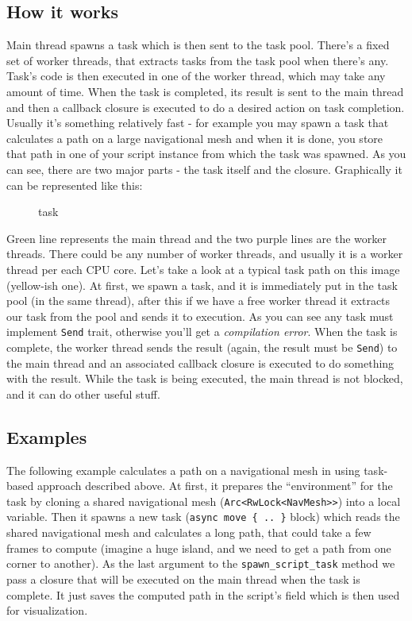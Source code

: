 \documentclass[
]{book}
\theoremstyle{definition}
\theoremstyle{definition}
\theoremstyle{definition}
\theoremstyle{definition}
\theoremstyle{remark}
\begin{document}
\subsection{How it works}\label{how-it-works}

Main thread spawns a task which is then sent to the task pool. There's a fixed set of worker threads, that extracts tasks from the task pool when there's any. Task's code is then executed in one of the worker thread, which may take any amount of time. When the task is completed, its result is sent to the main thread and then a callback closure is executed to do a desired action on task completion. Usually it's something relatively fast - for example you may spawn a task that calculates a path on a large navigational mesh and when it is done, you store that path in one of your script instance from which the task was spawned. As you can see, there are two major parts - the task itself and the closure. Graphically it can be represented like this:

\begin{figure}
\centering

\caption{task}
\end{figure}

Green line represents the main thread and the two purple lines are the worker threads. There could be any number of worker threads, and usually it is a worker thread per each CPU core. Let's take a look at a typical task path on this image (yellow-ish one). At first, we spawn a task, and it is immediately put in the task pool (in the same thread), after this if we have a free worker thread it extracts our task from the pool and sends it to execution. As you can see any task must implement \texttt{Send} trait, otherwise you'll get a \emph{compilation error}. When the task is complete, the worker thread sends the result (again, the result must be \texttt{Send}) to the main thread and an associated callback closure is executed to do something with the result. While the task is being executed, the main thread is not blocked, and it can do other useful stuff.

\subsection{Examples}\label{examples}

The following example calculates a path on a navigational mesh in using task-based approach described above. At first, it prepares the ``environment'' for the task by cloning a shared navigational mesh (\texttt{Arc\textless{}RwLock\textless{}NavMesh\textgreater{}\textgreater{}}) into a local variable. Then it spawns a new task (\texttt{async\ move\ \{\ ..\ \}} block) which reads the shared navigational mesh and calculates a long path, that could take a few frames to compute (imagine a huge island, and we need to get a path from one corner to another). As the last argument to the \texttt{spawn\_script\_task} method we pass a closure that will be executed on the main thread when the task is complete. It just saves the computed path in the script's field which is then used for visualization.
\end{document}
